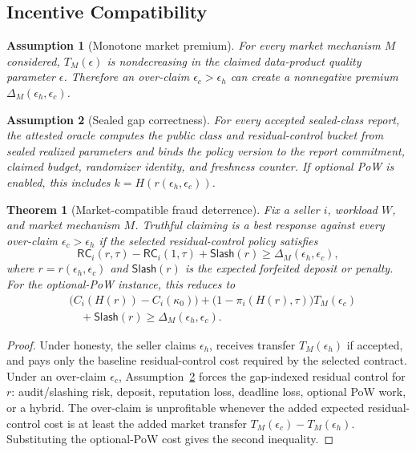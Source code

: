 \documentclass[conference]{IEEEtran}
\newtheorem{assumption}{Assumption}[section]
\newtheorem{theorem}{Theorem}[section]
\newcommand{\eps}{\epsilon}
\begin{document}
\subsection{Incentive Compatibility}

\begin{assumption}[Monotone market premium]
\label{ass:premium}
For every market mechanism $M$ considered, $T_M(\eps)$ is nondecreasing in the claimed data-product quality parameter $\eps$. Therefore an over-claim $\eps_c>\eps_h$ can create a nonnegative premium $\Delta_M(\eps_h,\eps_c)$.
\end{assumption}

\begin{assumption}[Sealed gap correctness]
\label{ass:sealed-gap}
For every accepted sealed-class report, the attested oracle computes the public class and residual-control bucket from sealed realized parameters and binds the policy version to the report commitment, claimed budget, randomizer identity, and freshness counter. If optional PoW is enabled, this includes $k=H(r(\eps_h,\eps_c))$.
\end{assumption}

\begin{theorem}[Market-compatible fraud deterrence]
\label{thm:deterrence}
Fix a seller $i$, workload $W$, and market mechanism $M$. Truthful claiming is a best response against every over-claim $\eps_c>\eps_h$ if the selected residual-control policy satisfies
\[
\mathsf{RC}_i(r,\tau)-\mathsf{RC}_i(1,\tau)+\mathsf{Slash}(r)\ge \Delta_M(\eps_h,\eps_c),
\]
where $r=r(\eps_h,\eps_c)$ and $\mathsf{Slash}(r)$ is the expected forfeited deposit or penalty. For the optional-PoW instance, this reduces to
\[
\begin{aligned}
&\big(C_i(H(r))-C_i(\kappa_0)\big)
 + \big(1-\pi_i(H(r),\tau)\big)T_M(\eps_c)\\
&\quad +\mathsf{Slash}(r)\ge \Delta_M(\eps_h,\eps_c).
\end{aligned}
\]
\end{theorem}

\begin{proof}
Under honesty, the seller claims $\eps_h$, receives transfer $T_M(\eps_h)$ if accepted, and pays only the baseline residual-control cost required by the selected contract. Under an over-claim $\eps_c$, Assumption~\ref{ass:sealed-gap} forces the gap-indexed residual control for $r$: audit/slashing risk, deposit, reputation loss, deadline loss, optional PoW work, or a hybrid. The over-claim is unprofitable whenever the added expected residual-control cost is at least the added market transfer $T_M(\eps_c)-T_M(\eps_h)$. Substituting the optional-PoW cost gives the second inequality.
\end{proof}
\end{document}
